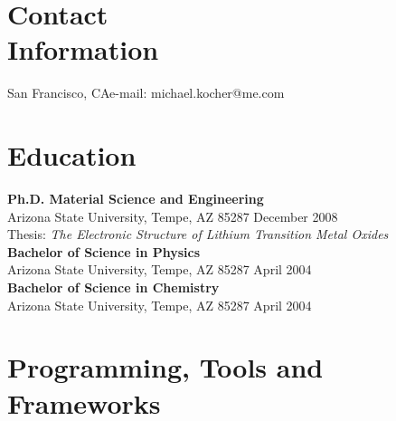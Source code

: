 \documentclass[margin,line]{resume}
\begin{document}
\begin{resume}

    \section{\mysidestyle Contact\\Information}

    San Francisco, CA\hfill e-mail: michael.kocher@me.com  \vspace{0mm}\\\vspace{-4.5mm}%


    
    \section{\mysidestyle Education}

    \textbf{Ph.D. Material Science and Engineering} \\
    Arizona State University,  Tempe, AZ 85287 \hfill December 2008\\
    Thesis: \textsl{The Electronic Structure of Lithium Transition Metal Oxides}\vspace{2mm}\\
    \textbf{Bachelor of Science in Physics} \\
    Arizona State University,  Tempe, AZ 85287 \hfill April 2004\vspace{2mm}\\
    \textbf{Bachelor of Science in Chemistry}\\
    Arizona State University,  Tempe, AZ 85287 \hfill April 2004\\\vspace{-3mm}




    \section{\mysidestyle Programming, Tools and Frameworks}


\end{resume}
\end{document}
